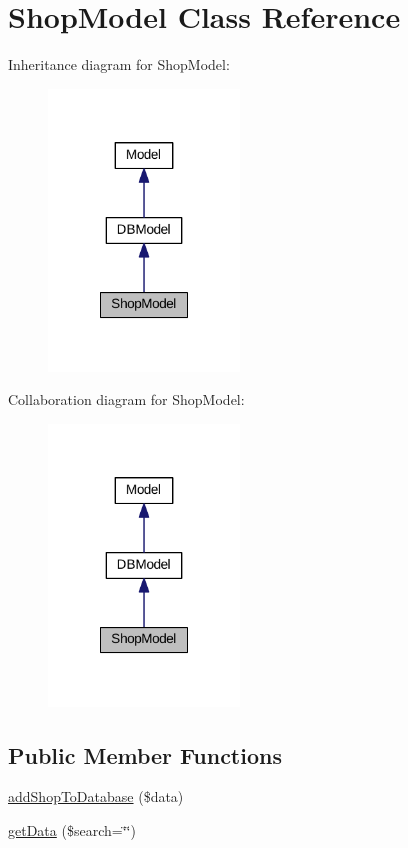 \hypertarget{classShopModel}{\section{Shop\+Model Class Reference}
\label{classShopModel}
}


Inheritance diagram for Shop\+Model\+:\nopagebreak
\begin{figure}[H]
\begin{center}
\leavevmode
\includegraphics[width=144pt]{classShopModel__inherit__graph}
\end{center}
\end{figure}


Collaboration diagram for Shop\+Model\+:\nopagebreak
\begin{figure}[H]
\begin{center}
\leavevmode
\includegraphics[width=144pt]{classShopModel__coll__graph}
\end{center}
\end{figure}
\subsection*{Public Member Functions}
\begin{DoxyCompactItemize}
\item 
\hyperlink{classShopModel_a67653f592dcfd15e7c3e8a0262fb824b}{add\+Shop\+To\+Database} (\$data)
\item 
\hyperlink{classShopModel_a5c5c4b2e0ea0e4adb98e6e6dea5011b6}{get\+Data} (\$search=\char`\"{}\char`\"{})
\end{DoxyCompactItemize}
